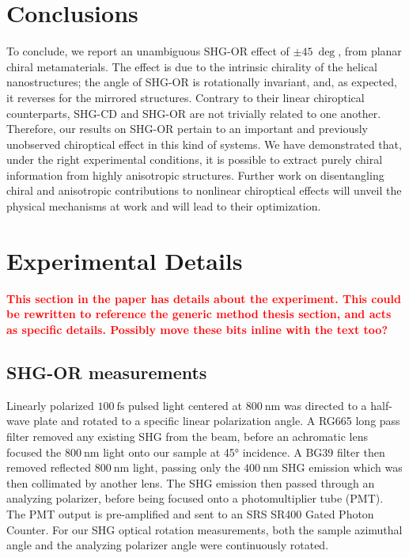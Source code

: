 \section{Conclusions}\label{sec:results:OAinPlanarNanohelices:conclusions}
To conclude, we report an unambiguous SHG-OR effect of $\pm \SI{45}{\deg}$, from planar chiral metamaterials. The effect is due to the intrinsic chirality of the helical nanostructures; the angle of SHG-OR is rotationally invariant, and, as expected, it reverses for the mirrored structures. Contrary to their linear chiroptical counterparts, SHG-CD and SHG-OR are not trivially related to one another. Therefore, our results on SHG-OR pertain to an important and previously unobserved chiroptical effect in this kind of systems. We have demonstrated that, under the right experimental conditions, it is possible to extract purely chiral information from highly anisotropic structures. Further work on disentangling chiral and anisotropic contributions to nonlinear chiroptical effects will unveil the physical mechanisms at work and will lead to their optimization. 

\section{Experimental Details}\label{sec:results:OAinPlanarNanohelices:methods}
\textcolor{red}{
\textbf{This section in the paper has details about the experiment. This could be rewritten to reference the generic method thesis section, and acts as specific details. Possibly move these bits inline with the text too?}
}

\subsection{SHG-OR measurements}
Linearly polarized $\SI{100}{\femto\s}$ pulsed light centered at $\SI{800}{\nano\m}$ was directed to a half-wave plate and rotated to a specific linear polarization angle. A RG665 long pass filter removed any existing SHG from the beam, before an achromatic lens focused the $\SI{800}{\nano\m}$ light onto our sample at 45° incidence. A BG39 filter then removed reflected $\SI{800}{\nano\m}$ light, passing only the $\SI{400}{\nano\m}$ SHG emission which was then collimated by another lens. The SHG emission then passed through an analyzing polarizer, before being focused onto a photomultiplier tube (PMT). The PMT output is pre-amplified and sent to an SRS SR400 Gated Photon Counter. For our SHG optical rotation measurements, both the sample azimuthal angle and the analyzing polarizer angle were continuously rotated. 

